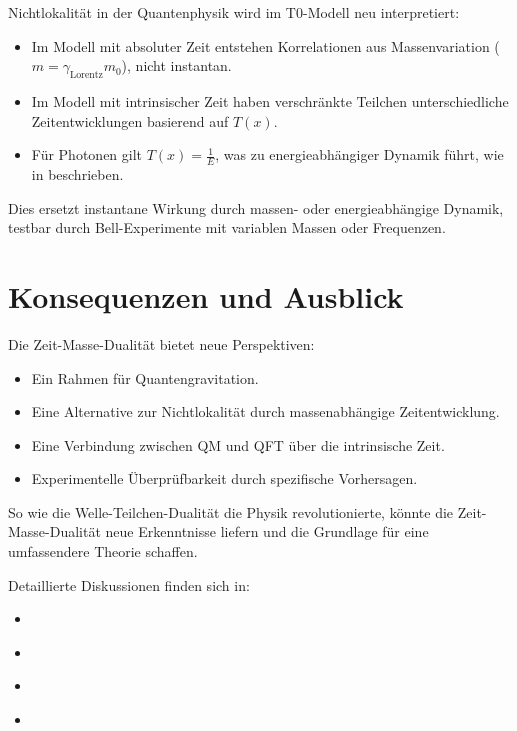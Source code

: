 \documentclass[a4paper,12pt]{article}
\newcommand{\Tfield}{T(x)}
\newcommand{\gammaf}{\gamma_{\text{Lorentz}}}
\begin{document}
	Nichtlokalität in der Quantenphysik wird im T0-Modell neu interpretiert:
	\begin{itemize}
		\item Im Modell mit absoluter Zeit entstehen Korrelationen aus Massenvariation (\( m = \gammaf m_0 \)), nicht instantan.
		\item Im Modell mit intrinsischer Zeit haben verschränkte Teilchen unterschiedliche Zeitentwicklungen basierend auf \(\Tfield\).
		\item Für Photonen gilt \(\Tfield = \frac{1}{E}\), was zu energieabhängiger Dynamik führt, wie in \cite{pascher_photons_2025} beschrieben.
	\end{itemize}
	
	Dies ersetzt instantane Wirkung durch massen- oder energieabhängige Dynamik, testbar durch Bell-Experimente mit variablen Massen oder Frequenzen.
	
	\section{Konsequenzen und Ausblick}
	
	Die Zeit-Masse-Dualität bietet neue Perspektiven:
	\begin{itemize}
		\item Ein Rahmen für Quantengravitation.
		\item Eine Alternative zur Nichtlokalität durch massenabhängige Zeitentwicklung.
		\item Eine Verbindung zwischen QM und QFT über die intrinsische Zeit.
		\item Experimentelle Überprüfbarkeit durch spezifische Vorhersagen.
	\end{itemize}
	
	So wie die Welle-Teilchen-Dualität die Physik revolutionierte, könnte die Zeit-Masse-Dualität neue Erkenntnisse liefern und die Grundlage für eine umfassendere Theorie schaffen.
	
	Detaillierte Diskussionen finden sich in:
	\begin{itemize}
		\item \cite{pascher_planck_2025}
		\item \cite{pascher_params_2025}
		\item \cite{pascher_photons_2025}
		\item \cite{pascher_quantum_2025}
	\end{itemize}
	
\end{document}
